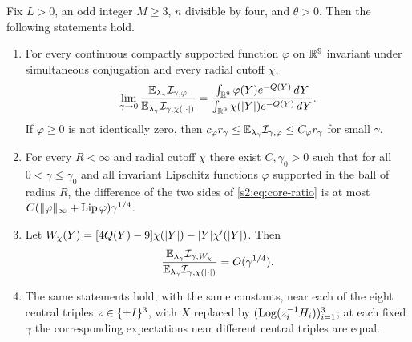 \begin{theorem}\label{s2:thm:central}
Fix $L>0$, an odd integer $M\ge3$, $n$ divisible by four, and $\theta>0$. Then the following statements hold.
\begin{enumerate}
\item For every continuous compactly supported function $\varphi$ on $\mathbb R^9$ invariant under simultaneous conjugation and every radial cutoff $\chi$,
\begin{equation}\label{s2:eq:core-ratio}
 \lim_{\gamma\to0}\frac{\mathbb E_{\lambda_\gamma}\mathcal I_{\gamma,\varphi}}{\mathbb E_{\lambda_\gamma}\mathcal I_{\gamma,\chi(\lvert \cdot\rvert)}}=\frac{\int_{\mathbb R^9}\varphi(Y)e^{-Q(Y)}\,dY}{\int_{\mathbb R^9}\chi(\lvert Y\rvert)e^{-Q(Y)}\,dY}.
\end{equation}
If $\varphi\ge0$ is not identically zero, then $c_\varphi r_\gamma\le\mathbb E_{\lambda_\gamma}\mathcal I_{\gamma,\varphi}\le C_\varphi r_\gamma$ for small $\gamma$.
\item For every $R<\infty$ and radial cutoff $\chi$ there exist $C,\gamma_0>0$ such that for all $0<\gamma\le\gamma_0$ and all invariant Lipschitz functions $\varphi$ supported in the ball of radius $R$, the difference of the two sides of \eqref{s2:eq:core-ratio} is at most $C(\lVert \varphi\rVert_\infty+\operatorname{Lip}\varphi)\gamma^{1/4}$.
\item Let $W_\chi(Y)=[4Q(Y)-9]\chi(\lvert Y\rvert)-\lvert Y\rvert\chi'(\lvert Y\rvert)$. Then
\[
 \frac{\mathbb E_{\lambda_\gamma}\mathcal I_{\gamma,W_\chi}}{\mathbb E_{\lambda_\gamma}\mathcal I_{\gamma,\chi(\lvert \cdot\rvert)}}=O(\gamma^{1/4}).
\]
\item The same statements hold, with the same constants, near each of the eight central triples $z\in\{\pm I\}^3$, with $X$ replaced by $(\operatorname{Log}(z_i^{-1}H_i))_{i=1}^3$; at each fixed $\gamma$ the corresponding expectations near different central triples are equal.
\end{enumerate}
\end{theorem}

